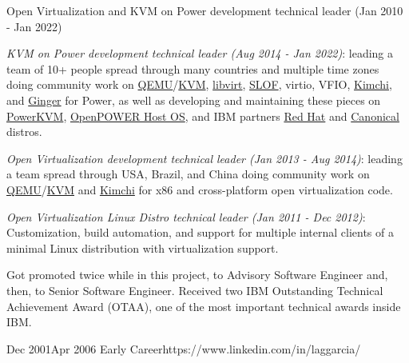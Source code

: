 \documentclass[10pt]{article} %
\begin{document}
\job
{Open Virtualization and KVM on Power development technical leader (Jan 2010 - Jan 2022)}
{

\begin{itemize-noindent}

\item{\textit{KVM on Power development technical leader (Aug 2014 - Jan 2022)}: leading a team of 10+ people spread through many countries and multiple time zones doing community work on \href{http://www.qemu.org/}{QEMU}/\href{http://www.linux-kvm.org}{KVM}, \href{https://libvirt.org/}{libvirt}, \href{https://github.com/aik/SLOF}{SLOF}, virtio, VFIO, \href{https://github.com/kimchi-project/kimchi}{Kimchi}, and \href{https://github.com/kimchi-project/ginger}{Ginger} for Power, as well as developing and maintaining these pieces on \href{http://www-03.ibm.com/systems/power/software/linux/powerkvm/}{PowerKVM}, \href{https://open-power-host-os.github.io/}{OpenPOWER Host OS}, and IBM partners \href{https://www.redhat.com/en}{Red Hat} and \href{https://canonical.com/}{Canonical} distros.}

\item{\textit{Open Virtualization development technical leader (Jan 2013 - Aug 2014)}: leading a team spread through USA, Brazil, and China doing community work on \href{http://www.qemu.org/}{QEMU}/\href{http://www.linux-kvm.org}{KVM} and \href{https://github.com/kimchi-project/kimchi}{Kimchi} for x86 and cross-platform open virtualization code.}

\item{\textit{Open Virtualization Linux Distro technical leader (Jan 2011 - Dec 2012)}: Customization, build automation, and support for multiple internal clients of a minimal Linux distribution with virtualization support.}

\item{Got promoted twice while in this project, to Advisory Software Engineer and, then, to Senior Software Engineer. Received two IBM Outstanding Technical Achievement Award (OTAA), one of the most important technical awards inside IBM.}

\end{itemize-noindent}

}


\employer
{Dec 2001}{Apr 2006}
{Early Career}{https://www.linkedin.com/in/laggarcia/}
\end{document}
